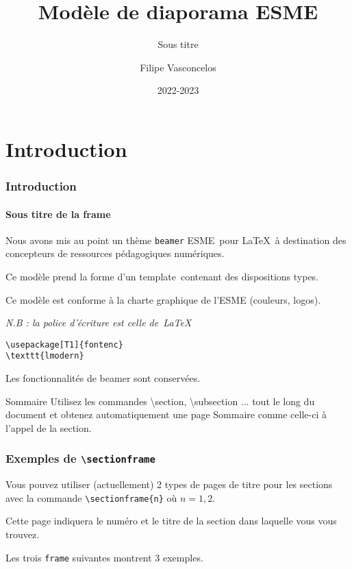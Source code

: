\documentclass[t,aspectratio=169]{beamer}
\title{Modèle de diaporama ESME}
\subtitle{Sous titre}
\author{Filipe Vasconcelos\inst{1}}
\institute{
    \inst{1} ESME Sudria, Lille, \textcolor{blue}{\texttt{filipe.vasconcelo@esme.fr}}
}
\date{2022-2023}
\begin{document}
\section{Introduction}
\begin{frame}[fragile] 
\frametitle{Introduction} 
\framesubtitle{Sous titre de la frame} 

Nous avons mis au point un thème \texttt{beamer} \og ESME\fg~pour 
\LaTeX~à destination des concepteurs de ressources pédagogiques 
numériques.\newline

Ce modèle prend la forme d'un \og template\fg~contenant des 
dispositions types.\newline

Ce modèle est conforme à la charte graphique de l'ESME (couleurs, 
logos).

\emph{N.B : la police d'écriture est celle de~\LaTeX}\newline

\begin{verbatim}
\usepackage[T1]{fontenc}
\texttt{lmodern}
\end{verbatim}

Les fonctionnalités de beamer sont conservées.
\end{frame}

\begin{frame}{Sommaire}
    \tableofcontents
    \scriptsize
    Utilisez les commandes \textbackslash section, \textbackslash subsection ...
    tout le long du document et obtenez automatiquement une page Sommaire 
    comme celle-ci à l'appel de la section. 
\end{frame}

\begin{frame} 
    \frametitle{Exemples de \texttt{\textbackslash sectionframe}}

    Vous pouvez utiliser (actuellement) 2 types de pages de titre pour
    les sections avec la commande \texttt{\textbackslash sectionframe\{n\}} 
    où $n=1,2$.\newline

    Cette page indiquera le numéro et le titre de la section dans laquelle
    vous vous trouvez.\newline

    Les trois \texttt{frame} suivantes montrent 3 exemples.
\end{frame}
\end{document}
